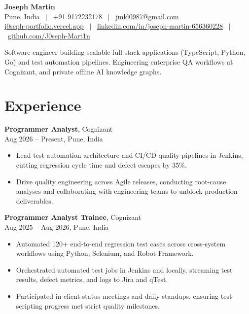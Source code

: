 \documentclass[letterpaper,10pt]{article}
\begin{document}
\begin{center}
    {\Huge \textbf{Joseph Martin}} \\ \vspace{4pt}
    Pune, India \ $|$ \ +91 9172232178 \ $|$ \ \href{mailto:jmkl0987@gmail.com}{jmkl0987@gmail.com} \\ \vspace{2pt}
    \href{https://j0seph-portfolio.vercel.app/}{j0seph-portfolio.vercel.app} \ $|$ \ \href{https://linkedin.com/in/joseph-martin-656360228}{linkedin.com/in/joseph-martin-656360228} \ $|$ \ \href{https://github.com/J0seph-Mart1n}{github.com/J0seph-Mart1n}
\end{center}

\vspace{2pt}
\noindent Software engineer building scalable full-stack applications (TypeScript, Python, Go) and test automation pipelines. Engineering enterprise QA workflows at Cognizant, and private offline AI knowledge graphs.
\vspace{4pt}

\section{Experience}

\vspace{2pt}
\textbf{Programmer Analyst}, Cognizant \\
Aug 2026 -- Present, Pune, India
\begin{itemize}
    \item Lead test automation architecture and CI/CD quality pipelines in Jenkins, cutting regression cycle time and defect escapes by 35\%.
    \item Drive quality engineering across Agile releases, conducting root-cause analyses and collaborating with engineering teams to unblock production deliverables.
\end{itemize}

\vspace{3pt}
\textbf{Programmer Analyst Trainee}, Cognizant \\
Aug 2025 -- Aug 2026, Pune, India
\begin{itemize}
    \item Automated 120+ end-to-end regression test cases across cross-system workflows using Python, Selenium, and Robot Framework.
    \item Orchestrated automated test jobs in Jenkins and locally, streaming test results, defect metrics, and logs to Jira and qTest.
    \item Participated in client status meetings and daily standups, ensuring test scripting progress met strict quality milestones.
\end{itemize}
\end{document}
